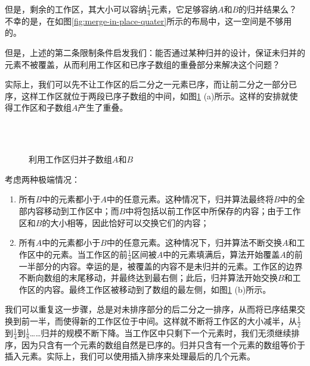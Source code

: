\documentclass{ctexart}
\begin{document}
但是，剩余的工作区，其大小可以容纳$\frac{1}{4}$元素，它足够容纳$A$和$B$的归并结果么？不幸的是，在如图\ref{fig:merge-in-place-quater}所示的布局中，这一空间是不够用的。

但是，上述的第二条限制条件启发我们：能否通过某种归并的设计，保证未归并的元素不被覆盖，从而利用工作区和已序子数组的重叠部分来解决这个问题？

实际上，我们可以先不让工作区的后二分之一元素已序，而让前二分之一部分已序，这样工作区就位于两段已序子数组的中间，如图\ref{fig:merge-in-place-setup} (a)所示。这样的安排就使得工作区和子数组$A$产生了重叠\cite{msort-in-place}。

\begin{figure}[htbp]
 \centering
  \\
  \\
 \caption{利用工作区归并子数组$A$和$B$}
 \label{fig:merge-in-place-setup}
\end{figure}

考虑两种极端情况：

\begin{enumerate}
\item 所有$B$中的元素都小于$A$中的任意元素。这种情况下，归并算法最终将$B$中的全部内容移动到工作区中；而$B$中将包括以前工作区中所保存的内容；由于工作区和$B$的大小相等，因此恰好可以交换它们的内容；
\item 所有$A$中的元素都小于$B$中的任意元素。这种情况下，归并算法不断交换$A$和工作区中的元素。当工作区的前$\frac{1}{4}$区间被$A$中的元素填满后，算法开始覆盖$A$的前一半部分的内容。幸运的是，被覆盖的内容不是未归并的元素。工作区的边界不断向数组的末尾移动，并最终达到最右侧；此后，归并算法开始交换$B$和工作区的内容。最终工作区被移动到了数组的最左侧，如图\ref{fig:merge-in-place-setup} (b)所示。
\end{enumerate}

我们可以重复这一步骤，总是对未排序部分的后二分之一排序，从而将已序结果交换到前一半，而使得新的工作区位于中间。这样就不断将工作区的大小减半，从$\frac{1}{2}$到$\frac{1}{4}$到$\frac{1}{8}$……归并的规模不断下降。当工作区中只剩下一个元素时，我们无须继续排序，因为只含有一个元素的数组自然是已序的。归并只含有一个元素的数组等价于插入元素。实际上，我们可以使用插入排序来处理最后的几个元素。
\end{document}
